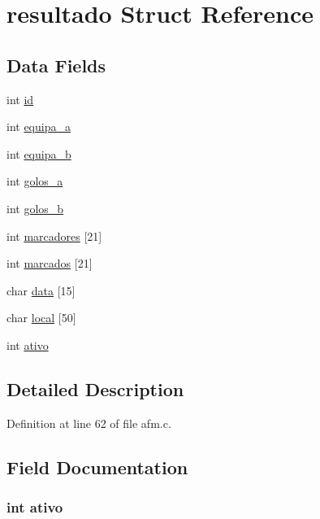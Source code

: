 \hypertarget{structresultado}{\section{resultado \-Struct \-Reference}
\label{structresultado}
}
\subsection*{\-Data \-Fields}
\begin{DoxyCompactItemize}
\item 
int \hyperlink{structresultado_a7441ef0865bcb3db9b8064dd7375c1ea}{id}
\item 
int \hyperlink{structresultado_ace35f821369216c24a34e4fba3edb969}{equipa\-\_\-a}
\item 
int \hyperlink{structresultado_aa9b8d46539767a87ab56c46e6444c9d6}{equipa\-\_\-b}
\item 
int \hyperlink{structresultado_a4300e439183b959a6dc34ce8dd37cea5}{golos\-\_\-a}
\item 
int \hyperlink{structresultado_a81df81d30e7a4500b5aede428858019b}{golos\-\_\-b}
\item 
int \hyperlink{structresultado_aa291c72d9a8809f53432613048a6fdfb}{marcadores} \mbox{[}21\mbox{]}
\item 
int \hyperlink{structresultado_a4e7b44437e808dd2fd5e173d52e71002}{marcados} \mbox{[}21\mbox{]}
\item 
char \hyperlink{structresultado_acce83e0644113db018f05aca84f07da3}{data} \mbox{[}15\mbox{]}
\item 
char \hyperlink{structresultado_ad0fbc2e59205ea604d8a9bac33ed9473}{local} \mbox{[}50\mbox{]}
\item 
int \hyperlink{structresultado_a5bc3bc4334890083c1af35103dae7964}{ativo}
\end{DoxyCompactItemize}


\subsection{\-Detailed \-Description}


\-Definition at line 62 of file afm.\-c.



\subsection{\-Field \-Documentation}
\hypertarget{structresultado_a5bc3bc4334890083c1af35103dae7964}{
\subsubsection[{ativo}]{\setlength{\rightskip}{0pt plus 5cm}int {\bf ativo}}}\label{structresultado_a5bc3bc4334890083c1af35103dae7964}


